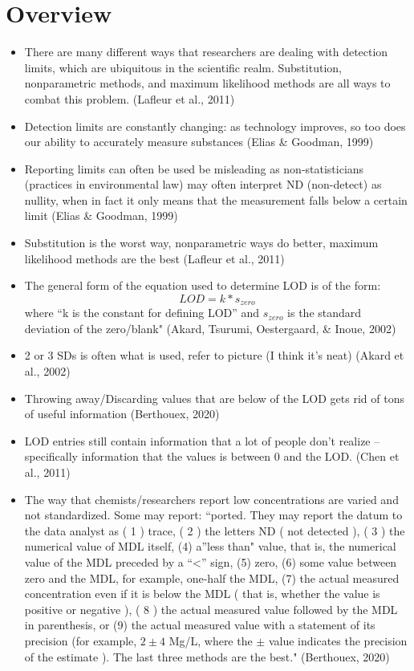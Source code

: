 \documentclass[12pt, twoside]{amherstthesis}
\begin{document}
\hypertarget{overview}{%
\section{Overview}\label{overview}}
\begin{itemize}
\item
  There are many different ways that researchers are dealing with detection limits, which are ubiquitous in the scientific realm. Substitution, nonparametric methods, and maximum likelihood methods are all ways to combat this problem. (Lafleur et al., 2011)
\item
  Detection limits are constantly changing: as technology improves, so too does our ability to accurately measure substances (Elias \& Goodman, 1999)
\item
  Reporting limits can often be used be misleading as non-statisticians (practices in environmental law) may often interpret ND (non-detect) as nullity, when in fact it only means that the measurement falls below a certain limit (Elias \& Goodman, 1999)
\item
  Substitution is the worst way, nonparametric ways do better, maximum likelihood methods are the best (Lafleur et al., 2011)
\item
  The general form of the equation used to determine LOD is of the form:
  \[LOD = k * s_{zero}\]
  where ``k is the constant for defining LOD'' and \(s_{zero}\) is the standard deviation of the zero/blank" (Akard, Tsurumi, Oestergaard, \& Inoue, 2002)
\item
  2 or 3 SDs is often what is used, refer to picture (I think it's neat) (Akard et al., 2002)
\item
  Throwing away/Discarding values that are below of the LOD gets rid of tons of useful information (Berthouex, 2020)
\item
  LOD entries still contain information that a lot of people don't realize -- specifically information that the values is between 0 and the LOD. (Chen et al., 2011)
\item
  The way that chemists/researchers report low concentrations are varied and not standardized. Some may report: ``ported. They may report the datum to the data analyst as ( 1 ) trace, ( 2 ) the letters ND ( not detected ), ( 3 ) the numerical value of MDL itself, (4) a''less than" value, that is, the numerical value of the MDL preceded by a ``\textless{}'' sign, (5) zero, (6) some value between zero and the MDL, for example, one-half the MDL, (7) the actual measured concentration even if it is below the MDL ( that is, whether the value is positive or negative ), ( 8 ) the actual measured value followed by the MDL in parenthesis, or (9) the actual measured value with a statement of its precision (for example, \(2 \pm 4\) Mg/L, where the \(\pm\) value indicates the precision of the estimate ). The last three methods are the best." (Berthouex, 2020)
\end{itemize}
\end{document}
